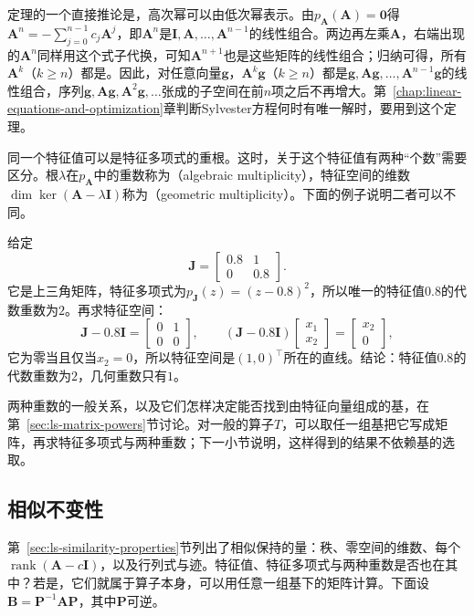 定理的一个直接推论是，高次幂可以由低次幂表示。由$p_{\bm A}(\bm A)=\bm0$得$\bm A^n=-\sum_{j=0}^{n-1}c_j\bm A^j$，即$\bm A^n$是$\bm I,\bm A,\ldots,\bm A^{n-1}$的线性组合。两边再左乘$\bm A$，右端出现的$\bm A^n$同样用这个式子代换，可知$\bm A^{n+1}$也是这些矩阵的线性组合；归纳可得，所有$\bm A^k$（$k\geq n$）都是。因此，对任意向量$\bm g$，$\bm A^k\bm g$（$k\geq n$）都是$\bm g,\bm A\bm g,\ldots,\bm A^{n-1}\bm g$的线性组合，序列$\bm g,\bm A\bm g,\bm A^2\bm g,\ldots$张成的子空间在前$n$项之后不再增大。第~\ref{chap:linear-equations-and-optimization}章判断Sylvester方程何时有唯一解时，要用到这个定理。

同一个特征值可以是特征多项式的重根。这时，关于这个特征值有两种“个数”需要区分。根$\lambda$在$p_{\bm A}$中的重数称为（algebraic multiplicity），特征空间的维数$\dim\ker(\bm A-\lambda\bm I)$称为（geometric multiplicity）。下面的例子说明二者可以不同。
\begin{example}[代数重数大于几何重数]
\label{ex:ls-multiplicity-gap}
给定
\[
 \bm J=\begin{bmatrix}0.8&1\\0&0.8\end{bmatrix}.
\]
它是上三角矩阵，特征多项式为$p_{\bm J}(z)=(z-0.8)^2$，所以唯一的特征值$0.8$的代数重数为$2$。再求特征空间：
\[
 \bm J-0.8\bm I=\begin{bmatrix}0&1\\0&0\end{bmatrix},\qquad
 (\bm J-0.8\bm I)\begin{bmatrix}x_1\\x_2\end{bmatrix}=\begin{bmatrix}x_2\\0\end{bmatrix},
\]
它为零当且仅当$x_2=0$，所以特征空间是$(1,0)^{\top}$所在的直线。结论：特征值$0.8$的代数重数为$2$，几何重数只有$1$。
\end{example}
两种重数的一般关系，以及它们怎样决定能否找到由特征向量组成的基，在第~\ref{sec:ls-matrix-powers}节讨论。对一般的算子$T$，可以取任一组基把它写成矩阵，再求特征多项式与两种重数；下一小节说明，这样得到的结果不依赖基的选取。

\subsection{相似不变性}
\label{sec:ls-eigen-similarity-invariance}

第~\ref{sec:ls-similarity-properties}节列出了相似保持的量：秩、零空间的维数、每个$\operatorname{rank}(\bm A-c\bm I)$，以及行列式与迹。特征值、特征多项式与两种重数是否也在其中？若是，它们就属于算子本身，可以用任意一组基下的矩阵计算。下面设$\bm B=\bm P^{-1}\bm A\bm P$，其中$\bm P$可逆。

